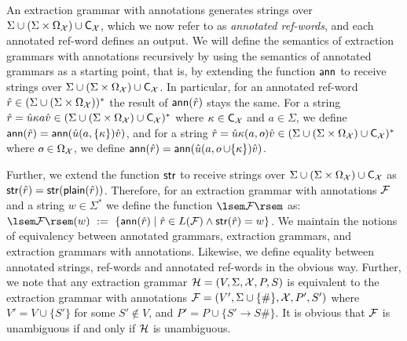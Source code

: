 An extraction grammar with annotations generates
strings over $\Sigma \cup (\Sigma\times\Omega_{\mathcal{X}}) \cup \textsf{C}_{\mathcal{X}}$, which we now refer to as \emph{annotated ref-words}, and each annotated ref-word defines an output.
We will define the semantics of extraction grammars with annotations recursively by using the semantics of annotated grammars as a starting point, that is, by extending the function $\mathsf{ann}$ to receive strings over $\Sigma \cup (\Sigma\times\Omega_{\mathcal{X}}) \cup \textsf{C}_{\mathcal{X}}$. In particular, for an annotated ref-word $\hat{r}\in (\Sigma \cup (\Sigma\times\Omega_{\mathcal{X}}))^*$ the result of $\mathsf{ann}(\hat{r})$ stays the same. For a string $\hat{r} = \hat{u} \kappa a \hat{v} \in (\Sigma \cup (\Sigma\times\Omega_{\mathcal{X}}) \cup \textsf{C}_{\mathcal{X}})^*$ where $\kappa\in \textsf{C}_{\mathcal{X}}$ and $a\in\Sigma$, we define $\mathsf{ann}(\hat{r}) = \mathsf{ann}(\hat{u} (a,\{\kappa\}) \hat{v})$, and for a string $\hat{r} = \hat{u} \kappa (a,\oout) \hat{v} \in (\Sigma \cup (\Sigma\times\Omega_\var) \cup \captures_\var)^*$ where $\oout\in\Omega_\var$, we define $\ann(\hat{r}) = \ann(\hat{u} (a,\oout\cup\{\kappa\}) \hat{v})$.

Further, we extend the function $\mathsf{str}$ to receive strings over $\Sigma \cup (\Sigma\times\Omega_{\mathcal{X}}) \cup \textsf{C}_{\mathcal{X}}$ as $\mathsf{str}(\hat{r}) = \mathsf{str}(\textsf{plain}(\hat{r}))$. Therefore, for an extraction grammar with annotations $\mathcal{F}$ and a string $w\in\Sigma^*$ we define the function $\sem{\cF}$ as: $\sem{\cF}(w) \ := \  \{\ann(\hat{r}) \mid \hat{r} \in L(\cF) \wedge \str(\hat{r}) = w\}$.
We maintain the notions of equivalency between annotated grammars, extraction grammars, and extraction grammars with annotations. Likewise, we define equality between annotated strings, ref-words and  annotated ref-words in the obvious way. Further, we note that any extraction grammar $\mathcal{H} = (V, \Sigma, \mathcal{X}, P, S)$ is equivalent to the extraction grammar with annotations $\mathcal{F} = (V', \Sigma\cup\{\#\}, \mathcal{X}, P', S')$ where $V' = V\cup\{S'\}$ for some $S'\not\in V$, and $P' = P \cup\{S'\to S\# \}$. It is obvious that $\mathcal{F}$ is unambiguous if and only if $\mathcal{H}$ is unambiguous.

